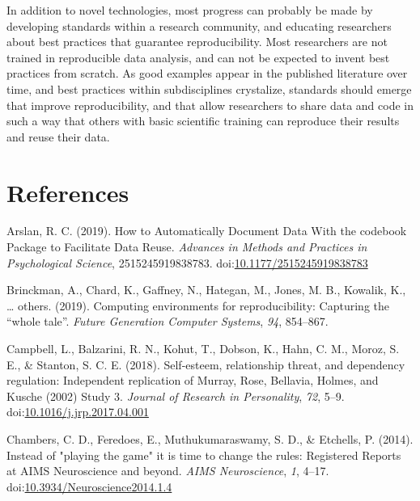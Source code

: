 \documentclass[,jou, a4paper,floatsintext]{apa6}
\begin{document}
In addition to novel technologies, most progress can probably be made by developing standards within a research community, and educating researchers about best practices that guarantee reproducibility. Most researchers are not trained in reproducible data analysis, and can not be expected to invent best practices from scratch. As good examples appear in the published literature over time, and best practices within subdisciplines crystalize, standards should emerge that improve reproducibility, and that allow researchers to share data and code in such a way that others with basic scientific training can reproduce their results and reuse their data.

\hypertarget{references}{%
\section{References}\label{references}}

\setlength{\parindent}{-0.5in}
\setlength{\leftskip}{0.5in}

\hypertarget{refs}{}
\leavevmode\hypertarget{ref-arslan_how_2019}{}%
Arslan, R. C. (2019). How to Automatically Document Data With the codebook Package to Facilitate Data Reuse. \emph{Advances in Methods and Practices in Psychological Science}, 2515245919838783. doi:\href{https://doi.org/10.1177/2515245919838783}{10.1177/2515245919838783}

\leavevmode\hypertarget{ref-brinckman2019computing}{}%
Brinckman, A., Chard, K., Gaffney, N., Hategan, M., Jones, M. B., Kowalik, K., \ldots{} others. (2019). Computing environments for reproducibility: Capturing the ``whole tale''. \emph{Future Generation Computer Systems}, \emph{94}, 854--867.

\leavevmode\hypertarget{ref-campbell_self-esteem_2018}{}%
Campbell, L., Balzarini, R. N., Kohut, T., Dobson, K., Hahn, C. M., Moroz, S. E., \& Stanton, S. C. E. (2018). Self-esteem, relationship threat, and dependency regulation: Independent replication of Murray, Rose, Bellavia, Holmes, and Kusche (2002) Study 3. \emph{Journal of Research in Personality}, \emph{72}, 5--9. doi:\href{https://doi.org/10.1016/j.jrp.2017.04.001}{10.1016/j.jrp.2017.04.001}

\leavevmode\hypertarget{ref-chambers_instead_2014}{}%
Chambers, C. D., Feredoes, E., Muthukumaraswamy, S. D., \& Etchells, P. (2014). Instead of "playing the game" it is time to change the rules: Registered Reports at AIMS Neuroscience and beyond. \emph{AIMS Neuroscience}, \emph{1}, 4--17. doi:\href{https://doi.org/10.3934/Neuroscience2014.1.4}{10.3934/Neuroscience2014.1.4}
\end{document}
